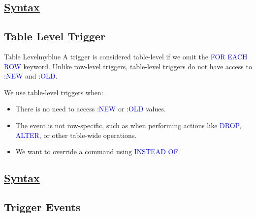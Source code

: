\subsection*{\underline{Syntax}}






\subsection{Table Level Trigger}

\begin{prettyBox}{Table Level}{myblue}
A trigger is considered table-level if we omit the \textcolor{blue}{FOR EACH ROW} keyword. Unlike row-level triggers, table-level triggers do not have access to \textcolor{blue}{:NEW} and \textcolor{blue}{:OLD}.

\vspace{0.15cm}
We use table-level triggers when:
\begin{itemize}
    \item There is no need to access \textcolor{blue}{:NEW} or \textcolor{blue}{:OLD} values.
    \item The event is not row-specific, such as when performing actions like \textcolor{blue}{DROP}, \textcolor{blue}{ALTER}, or other table-wide operations.
    \item We want to override a command using \textcolor{blue}{INSTEAD OF}.
\end{itemize}
\end{prettyBox}

\subsection*{\underline{Syntax}}






\subsection{Trigger Events}

